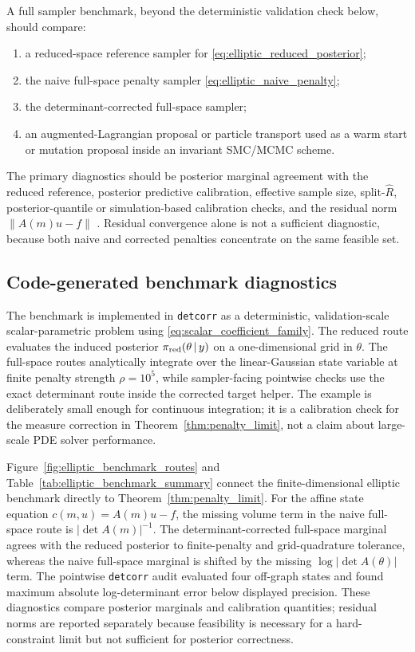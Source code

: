 \documentclass[11pt]{article}
\newcommand{\abs}[1]{\left\lvert #1\right\rvert}
\newcommand{\norm}[1]{\left\lVert #1\right\rVert}
\newcommand{\given}{\,|\,}
\newcommand{\detcorr}{\texttt{detcorr}}
\begin{document}
A full sampler benchmark, beyond the deterministic validation check below, should compare:
\begin{enumerate}[leftmargin=*]
 \item a reduced-space reference sampler for \eqref{eq:elliptic_reduced_posterior};
 \item the naive full-space penalty sampler \eqref{eq:elliptic_naive_penalty};
 \item the determinant-corrected full-space sampler;
 \item an augmented-Lagrangian proposal or particle transport used as a warm start or mutation proposal inside an invariant SMC/MCMC scheme.
\end{enumerate}
The primary diagnostics should be posterior marginal agreement with the reduced reference, posterior predictive calibration, effective sample size, split-\(\hat R\), posterior-quantile or simulation-based calibration checks, and the residual norm \(\norm{A(m)u-f}\) \cite{GelmanRubin1992,VehtariGelmanSimpsonCarpenterBurkner2021, CookGelmanRubin2006, ModrakMoonKimBurknerHuurreFaltejskovaGelmanVehtari2025}. Residual convergence alone is not a sufficient diagnostic, because both naive and corrected penalties concentrate on the same feasible set.

\subsection{Code-generated benchmark diagnostics}
\label{subsec:code_generated_benchmark_diagnostics}

The benchmark is implemented in \detcorr{} as a deterministic, validation-scale scalar-parametric problem using \eqref{eq:scalar_coefficient_family}. The reduced route evaluates the induced posterior \(\pi_{\rm red}(\theta\given y)\) on a one-dimensional grid in \(\theta\). The full-space routes analytically integrate over the linear-Gaussian state variable at finite penalty strength \(\rho=10^5\), while sampler-facing pointwise checks use the exact determinant route inside the corrected target helper. The example is deliberately small enough for continuous integration; it is a calibration check for the measure correction in Theorem~\ref{thm:penalty_limit}, not a claim about large-scale PDE solver performance.

Figure~\ref{fig:elliptic_benchmark_routes} and Table~\ref{tab:elliptic_benchmark_summary} connect the finite-dimensional elliptic benchmark directly to Theorem~\ref{thm:penalty_limit}. For the affine state equation \(c(m,u)=A(m)u-f\), the missing volume term in the naive full-space route is \(\abs{\det A(m)}^{-1}\). The determinant-corrected full-space marginal agrees with the reduced posterior to finite-penalty and grid-quadrature tolerance, whereas the naive full-space marginal is shifted by the missing \(\log\abs{\det A(\theta)}\) term. The pointwise \detcorr{} audit evaluated four off-graph states and found maximum absolute log-determinant error below displayed precision. These diagnostics compare posterior marginals and calibration quantities; residual norms are reported separately because feasibility is necessary for a hard-constraint limit but not sufficient for posterior correctness.
\end{document}

